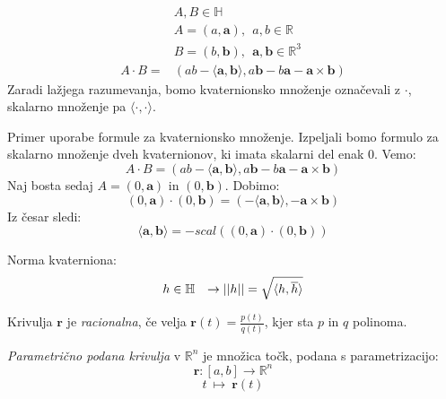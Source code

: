 \documentclass[mat1]{fmfdelo}
\newcommand{\R}{\mathbb R}
\newcommand{\HH}{\mathbb H}
\newcommand{\rr}{\boldsymbol r}
\begin{document}
\begin{equation*}
\begin{split}
& A,B \in \HH \\
&A = (a, \boldsymbol{a}), ~~ a,b \in \R \\
&B = (b, \boldsymbol{b}), ~~ \boldsymbol{a}, \boldsymbol{b} \in \R^3\\
A\cdot B = & \left( ab- \langle \boldsymbol{a},\boldsymbol{b} \rangle, a\boldsymbol{b}-b\boldsymbol{a}-\boldsymbol{a}\times \boldsymbol{b}  \right)
\end{split}
\end{equation*}
Zaradi lažjega razumevanja, bomo kvaternionsko množenje označevali z $\cdot$, skalarno množenje pa $\langle\cdot,\cdot\rangle$.
\begin{primer}
	Primer uporabe formule za kvaternionsko množenje. Izpeljali bomo formulo za skalarno množenje dveh kvaternionov, ki imata skalarni del enak 0.
	Vemo:
	\begin{equation*}
	A\cdot B =  \left( ab- \langle \boldsymbol{a},\boldsymbol{b} \rangle, a\boldsymbol{b}-b\boldsymbol{a}-\boldsymbol{a}\times \boldsymbol{b}  \right)
	\end{equation*}
	Naj bosta sedaj $A = (0,\boldsymbol{a})$ in $(0,\boldsymbol{b})$. Dobimo:
	\begin{equation*}
	(0,\boldsymbol{a}) \cdot (0,\boldsymbol{b}) = \left( -\langle \boldsymbol{a}, \boldsymbol{b} \rangle , -\boldsymbol{a} \times \boldsymbol{b} \right)
	\end{equation*}
	Iz česar sledi:
	\begin{equation*}
	\langle \boldsymbol{a},\boldsymbol{b} \rangle = -scal\left( (0,\boldsymbol{a}) \cdot (0,\boldsymbol{b}) \right)
	\end{equation*}
\end{primer}
Norma kvaterniona:
\begin{equation*}
\begin{array}{c c}
h \in \HH & \rightarrow ||h|| = \sqrt{\langle h, \overline{h}\rangle}
\end{array}
\end{equation*}
\begin{definicija}
Krivulja $\rr$ je \textit{racionalna}, če velja $\rr(t) = \frac{p(t)}{q(t)}$, kjer sta $p$ in $q$ polinoma.
\end{definicija}
\begin{definicija}
\textit{Parametrično podana krivulja} v $\R^n$ je množica točk, podana s parametrizacijo:
\begin{equation*}
\rr: [ a,b ] \rightarrow \R^n
\end{equation*}
\begin{equation*}
t ~ \longmapsto ~\rr(t)
\end{equation*}
\end{definicija}
\end{document}
